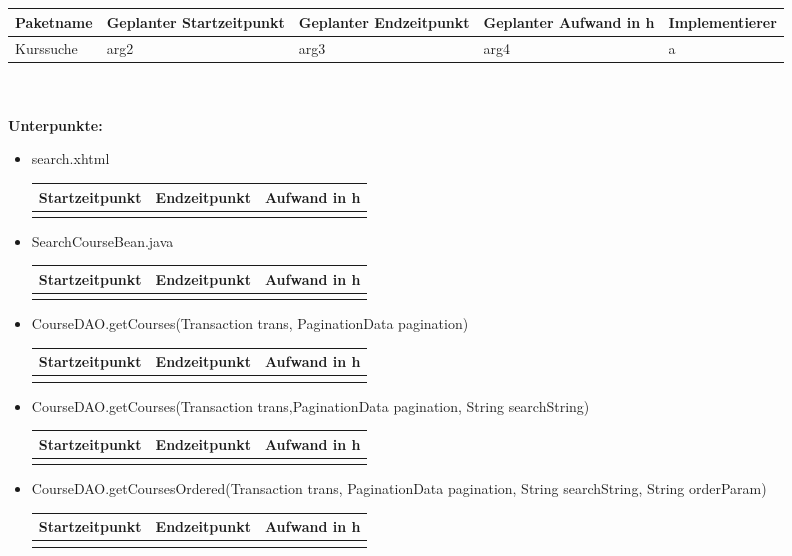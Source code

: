 \documentclass[12pt,a4paper]{scrreprt}
\newcommand{\Arbeitspaket}[5]{	\begin{tabular}{|p{4cm}|p{3cm}|p{3cm}|p{3cm}|p{3cm}|}
		\hline \textbf{Paketname} & \textbf{Geplanter Startzeitpunkt} & \textbf{Geplanter Endzeitpunkt} & \textbf{Geplanter Aufwand in h} & \textbf{Implementierer} \\ 
		\hline #1 & #2  & #3 & #4 & #5 \\ 
		\hline 
	\end{tabular} \ \\
	\ \\}
\begin{document}
	\ \\
	\ \\
	\Arbeitspaket{Kurssuche}{arg2}{arg3}{arg4}{a}
	\textbf{Unterpunkte:}
	\begin{itemize}
		\item search.xhtml\\
		\begin{tabular}{|p{4cm}|p{4cm}|p{4cm}|}
			\hline Startzeitpunkt & Endzeitpunkt & Aufwand in h \\ 
			\hline &      &  \\ 
			\hline 
		\end{tabular}	
		\item SearchCourseBean.java\\
		\begin{tabular}{|p{4cm}|p{4cm}|p{4cm}|}
			\hline Startzeitpunkt & Endzeitpunkt & Aufwand in h \\ 
			\hline &      &  \\ 
			\hline 
		\end{tabular}
		\item CourseDAO.getCourses(Transaction trans, PaginationData pagination)\\
		\begin{tabular}{|p{4cm}|p{4cm}|p{4cm}|}
			\hline Startzeitpunkt & Endzeitpunkt & Aufwand in h \\ 
			\hline &      &  \\ 
			\hline 
		\end{tabular}
		\item CourseDAO.getCourses(Transaction trans,PaginationData pagination, String searchString)\\
		\begin{tabular}{|p{4cm}|p{4cm}|p{4cm}|}
			\hline Startzeitpunkt & Endzeitpunkt & Aufwand in h \\ 
			\hline &      &  \\ 
			\hline 
		\end{tabular}
		\item CourseDAO.getCoursesOrdered(Transaction trans, PaginationData pagination, String searchString, String orderParam)\\
		\begin{tabular}{|p{4cm}|p{4cm}|p{4cm}|}
			\hline Startzeitpunkt & Endzeitpunkt & Aufwand in h \\ 
			\hline &      &  \\ 
			\hline 
		\end{tabular}
	\end{itemize}
	
\end{document}
